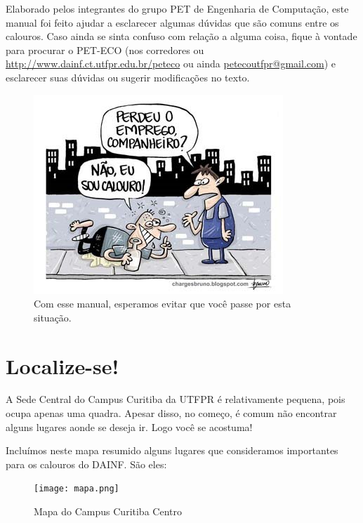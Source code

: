 \documentclass[a4paper,12pt,openany]{article}
\begin{document}
Elaborado pelos integrantes do grupo PET de Engenharia de Computação, este manual foi feito ajudar a esclarecer algumas dúvidas que são comuns entre os calouros. Caso ainda se sinta confuso com relação a alguma coisa, fique à vontade para procurar o PET-ECO (nos corredores ou \url{http://www.dainf.ct.utfpr.edu.br/peteco} ou ainda \href{mailto:petecoutfpr@gmail.com}{petecoutfpr@gmail.com}) e esclarecer suas dúvidas ou sugerir modificações no texto.


	\begin{figure}[ht!]  \centering
		\includegraphics[scale=1]{calouro.jpg}
		\caption{Com esse manual, esperamos evitar que você passe por esta situação.}
		\label{fig01}
	\end{figure}

	

\newpage
\section{Localize-se!}

A Sede Central do Campus Curitiba da UTFPR é relativamente pequena, pois ocupa apenas uma quadra. Apesar disso, no começo, é comum não encontrar alguns lugares aonde se deseja ir. Logo você se acostuma!


Incluímos neste mapa resumido alguns lugares que consideramos importantes para os calouros do DAINF. São eles:

	\begin{figure}[ht!]  \centering
		\texttt{[image: mapa.png]}
		\caption{Mapa do Campus Curitiba Centro}
		\label{fig03}
	\end{figure}
\end{document}
